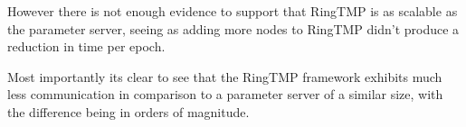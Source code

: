 However there is not enough evidence to support that RingTMP is as scalable as
the parameter server, seeing as adding more nodes to RingTMP didn't produce a
reduction in time per epoch.

Most importantly its clear to see that the RingTMP framework exhibits much less
communication in comparison to a parameter server of a similar size, with the
difference being in orders of magnitude.








